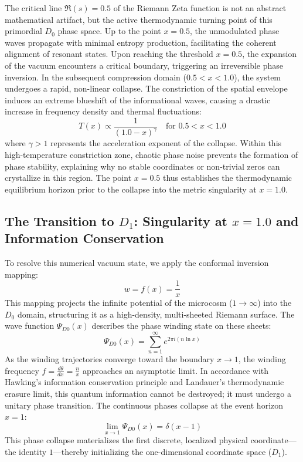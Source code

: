 \documentclass[11pt,a4paper]{article}
\theoremstyle{plain}
\theoremstyle{definition}
\theoremstyle{remark}
\begin{document}
The critical line $\mathfrak{R}(s) = 0.5$ of the Riemann Zeta function is not an abstract mathematical artifact, but the active thermodynamic turning point of this primordial $D_0$ phase space. Up to the point $x = 0.5$, the unmodulated phase waves propagate with minimal entropy production, facilitating the coherent alignment of resonant states. Upon reaching the threshold $x = 0.5$, the expansion of the vacuum encounters a critical boundary, triggering an irreversible phase inversion. In the subsequent compression domain ($0.5 < x < 1.0$), the system undergoes a rapid, non-linear collapse. The constriction of the spatial envelope induces an extreme blueshift of the informational waves, causing a drastic increase in frequency density and thermal fluctuations:
\begin{equation}
T(x) \propto \frac{1}{(1.0 - x)^{\gamma}} \quad \text{for } 0.5 < x < 1.0
\end{equation}
where $\gamma > 1$ represents the acceleration exponent of the collapse. Within this high-temperature constriction zone, chaotic phase noise prevents the formation of phase stability, explaining why no stable coordinates or non-trivial zeros can crystallize in this region. The point $x = 0.5$ thus establishes the thermodynamic equilibrium horizon prior to the collapse into the metric singularity at $x = 1.0$.

\subsection{The Transition to $D_1$: Singularity at $x = 1.0$ and Information Conservation}
To resolve this numerical vacuum state, we apply the conformal inversion mapping:
\begin{equation}
w = f(x) = \frac{1}{x}
\end{equation}
This mapping projects the infinite potential of the microcosm ($1 \to \infty$) into the $D_0$ domain, structuring it as a high-density, multi-sheeted Riemann surface. The wave function $\Psi_{D0}(x)$ describes the phase winding state on these sheets:
\begin{equation}
\Psi_{D0}(x) = \sum_{n=1}^{\infty} e^{2\pi i (n \ln x)}
\end{equation}
As the winding trajectories converge toward the boundary $x \to 1$, the winding frequency $f = \frac{d\theta}{dx} = \frac{n}{x}$ approaches an asymptotic limit. In accordance with Hawking's information conservation principle and Landauer's thermodynamic erasure limit, this quantum information cannot be destroyed; it must undergo a unitary phase transition. The continuous phases collapse at the event horizon $x = 1$:
\begin{equation}
\lim_{x \to 1} \Psi_{D0}(x) = \delta(x - 1)
\end{equation}
This phase collapse materializes the first discrete, localized physical coordinate—the identity $1$—thereby initializing the one-dimensional coordinate space ($D_1$).
\end{document}
